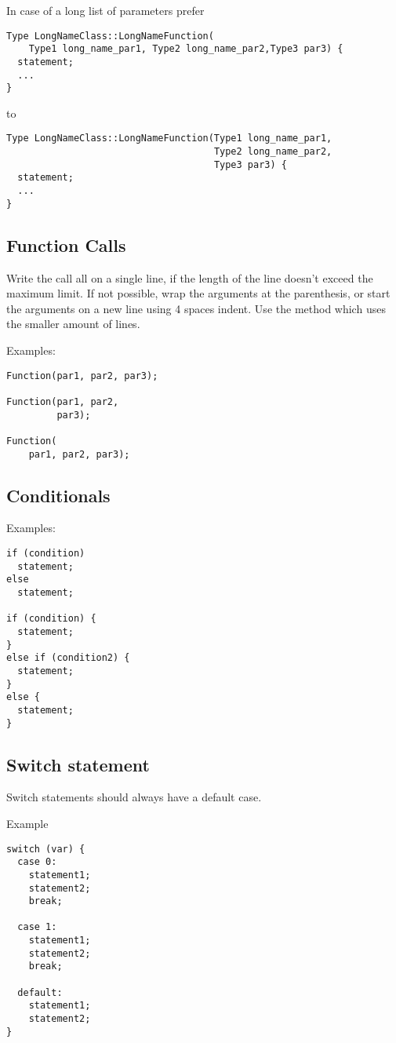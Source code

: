 \documentclass[a4paper]{article}
\begin{document}
In case of a long list of parameters prefer
\begin{lstlisting}
Type LongNameClass::LongNameFunction(
    Type1 long_name_par1, Type2 long_name_par2,Type3 par3) {
  statement;
  ...
}
\end{lstlisting}
to
\begin{lstlisting}
Type LongNameClass::LongNameFunction(Type1 long_name_par1,
                                     Type2 long_name_par2,
                                     Type3 par3) {
  statement;
  ...
}
\end{lstlisting}

\subsection{Function Calls}

Write the call all on a single line, if the length of the line doesn't exceed the maximum limit.
If not possible, wrap the arguments at the parenthesis, or start the arguments on a new line using 4 spaces indent.
Use the method which uses the smaller amount of lines.

Examples:
\begin{lstlisting}
Function(par1, par2, par3);

Function(par1, par2,
         par3);

Function(
    par1, par2, par3);
\end{lstlisting}

\subsection{Conditionals}

Examples:
\begin{lstlisting}
if (condition)
  statement;
else  
  statement;
  
if (condition) {
  statement;
}
else if (condition2) {
  statement;
}
else {
  statement;
}
\end{lstlisting}

\subsection{Switch statement}

Switch statements should always have a default case.

Example
\begin{lstlisting}
switch (var) {
  case 0:
    statement1;
    statement2;
    break;

  case 1:
    statement1;
    statement2;
    break;

  default:
    statement1;
    statement2;  
}
\end{lstlisting}
\end{document}
